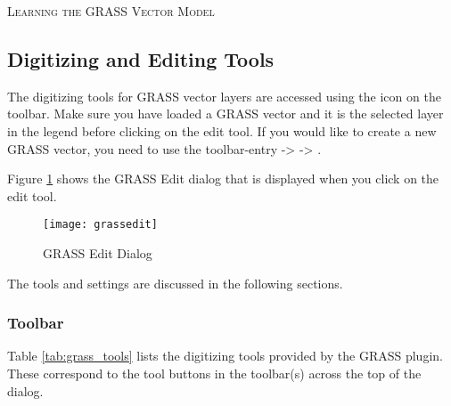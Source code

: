 \begin{Tip}\caption{\textsc{Learning the GRASS Vector Model}}
\end{Tip} 

\subsection{Digitizing and Editing Tools}
\label{grass_digitising}

The digitizing tools for GRASS vector layers are accessed using the
 icon on the toolbar. Make sure
you have loaded a GRASS vector and it is the selected layer in the legend before
clicking on the edit tool. If you would like to create a new GRASS vector, 
you need to use the toolbar-entry  ->  ->
.

Figure \ref{fig:grass_edit} shows the GRASS Edit dialog that is displayed
when you click on the edit tool. 

\begin{figure}[h]
   \begin{center}
   \caption{GRASS Edit Dialog}\label{fig:grass_edit}\smallskip
   \texttt{[image: grassedit]}
\end{center}  
\end{figure}

The tools and settings are discussed in the following sections.

\subsubsection{Toolbar}\label{label_grasstoolbar}

Table \ref{tab:grass_tools} lists the digitizing tools provided by the GRASS
plugin. These correspond to the tool buttons in the toolbar(s) across the top
of the dialog.

